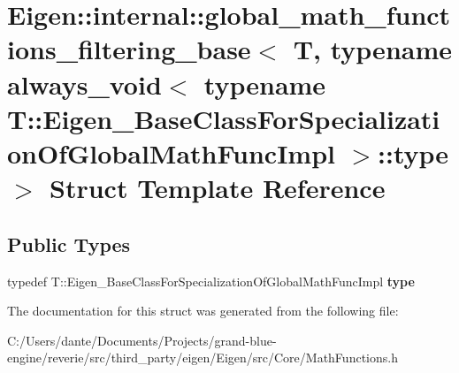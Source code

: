 \hypertarget{struct_eigen_1_1internal_1_1global__math__functions__filtering__base_3_01_t_00_01typename_01alwa3a21a82d868fc50f3fc9fd9dd230c694}{}\section{Eigen\+::internal\+::global\+\_\+math\+\_\+functions\+\_\+filtering\+\_\+base$<$ T, typename always\+\_\+void$<$ typename T\+::Eigen\+\_\+\+Base\+Class\+For\+Specialization\+Of\+Global\+Math\+Func\+Impl $>$\+::type $>$ Struct Template Reference}
\label{struct_eigen_1_1internal_1_1global__math__functions__filtering__base_3_01_t_00_01typename_01alwa3a21a82d868fc50f3fc9fd9dd230c694}
\subsection*{Public Types}
\begin{DoxyCompactItemize}
\item 
\mbox{\label{struct_eigen_1_1internal_1_1global__math__functions__filtering__base_3_01_t_00_01typename_01alwa3a21a82d868fc50f3fc9fd9dd230c694_a435532153415f72c680e30561e0005c4}} 
typedef T\+::\+Eigen\+\_\+\+Base\+Class\+For\+Specialization\+Of\+Global\+Math\+Func\+Impl {\bfseries type}
\end{DoxyCompactItemize}


The documentation for this struct was generated from the following file\+:\begin{DoxyCompactItemize}
\item 
C\+:/\+Users/dante/\+Documents/\+Projects/grand-\/blue-\/engine/reverie/src/third\+\_\+party/eigen/\+Eigen/src/\+Core/Math\+Functions.\+h\end{DoxyCompactItemize}
